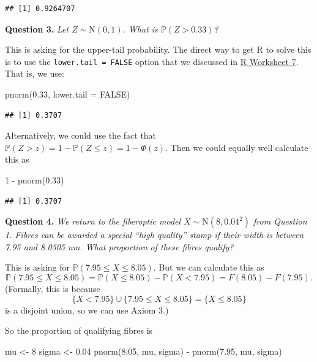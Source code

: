 \documentclass[
  a4paper,
]{book}
\newenvironment{Shaded}{\begin{snugshade}}{\end{snugshade}}
\newcommand{\AttributeTok}[1]{\textcolor[rgb]{0.77,0.63,0.00}{#1}}
\newcommand{\ConstantTok}[1]{\textcolor[rgb]{0.00,0.00,0.00}{#1}}
\newcommand{\DecValTok}[1]{\textcolor[rgb]{0.00,0.00,0.81}{#1}}
\newcommand{\FloatTok}[1]{\textcolor[rgb]{0.00,0.00,0.81}{#1}}
\newcommand{\FunctionTok}[1]{\textcolor[rgb]{0.00,0.00,0.00}{#1}}
\newcommand{\NormalTok}[1]{#1}
\newcommand{\OtherTok}[1]{\textcolor[rgb]{0.56,0.35,0.01}{#1}}
\newcommand{\SpecialCharTok}[1]{\textcolor[rgb]{0.00,0.00,0.00}{#1}}
\theoremstyle{definition}
\theoremstyle{definition}
\theoremstyle{definition}
\theoremstyle{definition}
\theoremstyle{remark}
\begin{document}
\begin{verbatim}
## [1] 0.9264707
\end{verbatim}

\textbf{Question 3.} \emph{Let \(Z \sim \mathrm{N}(0,1)\). What is \(\mathbb P(Z > 0.33)\)?}

This is asking for the upper-tail probability. The direct way to get R to solve this is to use the \texttt{lower.tail\ =\ FALSE} option that we discussed in \protect\hyperlink{r-work}{R Worksheet 7}. That is, we use:

\begin{Shaded}
\begin{Highlighting}[]
\FunctionTok{pnorm}\NormalTok{(}\FloatTok{0.33}\NormalTok{, }\AttributeTok{lower.tail =} \ConstantTok{FALSE}\NormalTok{)}
\end{Highlighting}
\end{Shaded}

\begin{verbatim}
## [1] 0.3707
\end{verbatim}

Alternatively, we could use the fact that \(\mathbb P(Z > z) = 1 - \mathbb P(Z \leq z) = 1 - \Phi(z)\). Then we could equally well calculate this as

\begin{Shaded}
\begin{Highlighting}[]
\DecValTok{1} \SpecialCharTok{{-}} \FunctionTok{pnorm}\NormalTok{(}\FloatTok{0.33}\NormalTok{)}
\end{Highlighting}
\end{Shaded}

\begin{verbatim}
## [1] 0.3707
\end{verbatim}

\textbf{Question 4.} \emph{We return to the fiberoptic model \(X \sim \mathrm{N}(8, 0.04^2)\) from Question 1. Fibres can be awarded a special ``high quality'' stamp if their width is between 7.95 and 8.0505 nm. What proportion of these fibres qualify?}

This is asking for \(\mathbb P(7.95 \leq X \leq 8.05)\). But we can calculate this as
\[ \mathbb P(7.95 \leq X \leq 8.05) = \mathbb P(X \leq 8.05) - \mathbb P(X < 7.95) = F(8.05) - F(7.95) .\]
(Formally, this is because
\[ \{X < 7.95\} \cup \{7.95 \leq X \leq 8.05\} = \{X \leq 8.05\} \]
is a disjoint union, so we can use Axiom 3.)

So the proportion of qualifying fibres is

\begin{Shaded}
\begin{Highlighting}[]
\NormalTok{mu }\OtherTok{\textless{}{-}} \DecValTok{8}
\NormalTok{sigma }\OtherTok{\textless{}{-}} \FloatTok{0.04}
\FunctionTok{pnorm}\NormalTok{(}\FloatTok{8.05}\NormalTok{, mu, sigma) }\SpecialCharTok{{-}} \FunctionTok{pnorm}\NormalTok{(}\FloatTok{7.95}\NormalTok{, mu, sigma)}
\end{Highlighting}
\end{Shaded}
\end{document}
